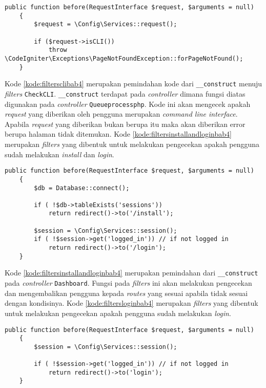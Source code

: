 \begin{lstlisting}[caption=Pemindahan kode pada \textit{Filters} \texttt{CheckCLI.php}, label=kode:filtersclibab4]
	public function before(RequestInterface $request, $arguments = null)
    {   
        $request = \Config\Services::request();

        if ($request->isCLI())
            throw \CodeIgniter\Exceptions\PageNotFoundException::forPageNotFound();
    }
\end{lstlisting}
Kode \ref{kode:filtersclibab4} merupakan pemindahan kode dari \texttt{\_\_construct} menuju \textit{filters} \texttt{CheckCLI}.  \texttt{\_\_construct} terdapat pada \textit{controller} dimana fungsi diatas digunakan pada \textit{controller} \texttt{Queueprocessphp}. Kode ini akan mengecek apakah \textit{request} yang diberikan oleh pengguna merupakan \textit{command line interface}. Apabila \textit{request} yang diberikan bukan berupa itu maka akan diberikan error berupa halaman tidak ditemukan. Kode \ref{kode:filtersinstallandloginbab4} merupakan \textit{filters} yang dibentuk untuk melakukan pengecekan apakah pengguna sudah melakukan \textit{install} dan \textit{login}.

\begin{lstlisting}[caption=Pemindahan kode pada \textit{Filters}, label=kode:filtersinstallandloginbab4]
	public function before(RequestInterface $request, $arguments = null)
    {   
        $db = Database::connect();

        if ( !$db->tableExists('sessions'))
			return redirect()->to('/install');
        
        $session = \Config\Services::session();
		if ( !$session->get('logged_in')) // if not logged in
			return redirect()->to('/login');
    }
\end{lstlisting}

Kode \ref{kode:filtersinstallandloginbab4} merupakan pemindahan dari \texttt{\_\_construct} pada \textit{controller} \texttt{Dashboard}. Fungsi pada \textit{filters} ini akan melakukan pengecekan dan mengembalikan pengguna kepada \textit{routes} yang sesuai apabila tidak sesuai dengan kondisinya. Kode \ref{kode:filtersloginbab4} merupakan \textit{filters} yang dibentuk untuk melakukan pengecekan apakah pengguna sudah melakukan \textit{login}.
\begin{lstlisting}[caption=Pemindahan kode pada \textit{Filters}, label=kode:filtersloginbab4]
	public function before(RequestInterface $request, $arguments = null)
    {
        $session = \Config\Services::session();

        if ( !$session->get('logged_in')) // if not logged in
			return redirect()->to('login');
    }
\end{lstlisting}

